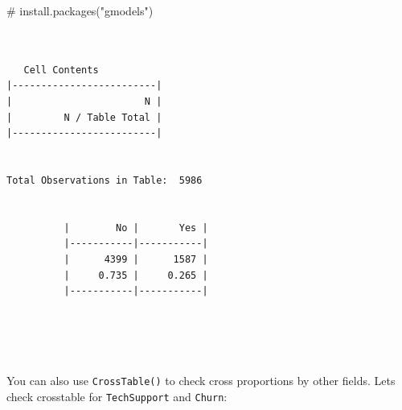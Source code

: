 \documentclass[
  letterpaper,
  DIV=11,
  numbers=noendperiod]{scrreprt}
\newenvironment{Shaded}{\begin{snugshade}}{\end{snugshade}}
\newcommand{\CommentTok}[1]{\textcolor[rgb]{0.37,0.37,0.37}{#1}}
\newcommand{\FunctionTok}[1]{\textcolor[rgb]{0.28,0.35,0.67}{#1}}
\newcommand{\NormalTok}[1]{\textcolor[rgb]{0.00,0.23,0.31}{#1}}
\newcommand{\SpecialCharTok}[1]{\textcolor[rgb]{0.37,0.37,0.37}{#1}}
\begin{document}
\begin{Shaded}
\begin{Highlighting}[]
\CommentTok{\# install.packages("gmodels")}
\end{Highlighting}
\end{Shaded}

\begin{Shaded}
\end{Shaded}

\begin{verbatim}

 
   Cell Contents
|-------------------------|
|                       N |
|         N / Table Total |
|-------------------------|

 
Total Observations in Table:  5986 

 
          |        No |       Yes | 
          |-----------|-----------|
          |      4399 |      1587 | 
          |     0.735 |     0.265 | 
          |-----------|-----------|



 
\end{verbatim}

You can also use \texttt{CrossTable()} to check cross proportions by
other fields. Lets check crosstable for \texttt{TechSupport} and
\texttt{Churn}:

\begin{Shaded}
\end{Shaded}
\end{document}
